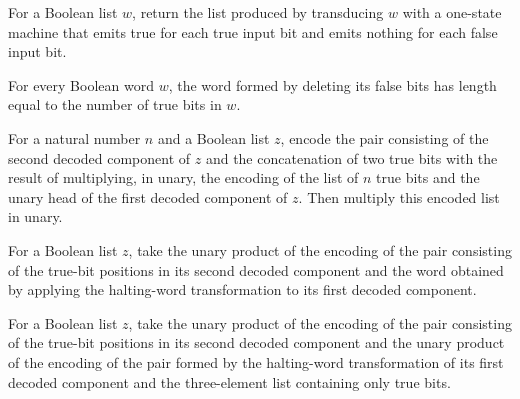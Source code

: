 \begin{definition}
\label{Randomized.onesW}
\leanok
{}
For a Boolean list $w$, return the list produced by transducing $w$ with a one-state
machine that emits true for each true input bit and emits nothing for each false input
bit.
\end{definition}

\begin{theorem}
\label{Randomized.length_onesW}
\leanok
{}
For every Boolean word $w$, the word formed by deleting its false bits has length equal
to the number of true bits in $w$.
\end{theorem}

\begin{definition}
\label{Randomized.hcLin}
\leanok
{}
For a natural number $n$ and a Boolean list $z$, encode the pair consisting of the
second decoded component of $z$ and the concatenation of two true bits with the result
of multiplying, in unary, the encoding of the list of $n$ true bits and the unary head
of the first decoded component of $z$. Then multiply this encoded list in unary.
\end{definition}

\begin{definition}
\label{Randomized.hcCD}
\leanok
{}
For a Boolean list $z$, take the unary product of the encoding of the pair consisting of
the true-bit positions in its second decoded component and the word obtained by applying
the halting-word transformation to its first decoded component.
\end{definition}

\begin{definition}
\label{Randomized.hcCD3}
\leanok
{}
For a Boolean list $z$, take the unary product of the encoding of the pair consisting of
the true-bit positions in its second decoded component and the unary product of the
encoding of the pair formed by the halting-word transformation of its first decoded
component and the three-element list containing only true bits.
\end{definition}

